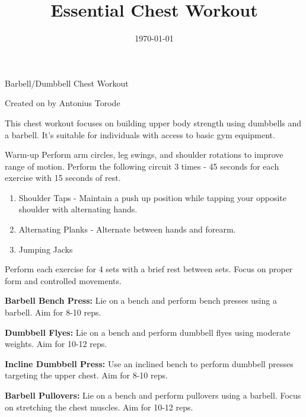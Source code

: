 \documentclass{article}
\newcounter{workout}
\newcounter{exercise}
\renewcommand{\maketitle}{
	\begin{center}
		{\Huge\bfseries\thetitle}
		
		\vspace{0.5em}
		
		Barbell/Dumbbell Chest Workout
		
		\vspace{0.5em}
		
		Created on \thedate\hspace{0.5em}by Antonius Torode
	\end{center}
}
\begin{document}
	\begin{tcolorbox}[colback=gray!15,colframe=black,enforce breakable,pad at break*=5mm,boxrule=0.5mm]
		
		\title{Essential Chest Workout}
		\date{\today}
		\maketitle
		
		This chest workout focuses on building upper body strength using dumbbells and a barbell. It's suitable for individuals with access to basic gym equipment.
		
		\begin{workoutbox}{Warm-up}
			Perform arm circles, leg swings, and shoulder rotations to improve range of motion. Perform the following circuit 3 times - 45 seconds for each exercise with 15 seconds of rest.
			\begin{enumerate}
				\item Shoulder Taps - Maintain a push up position while tapping your opposite shoulder with alternating hands.
				\item Alternating Planks - Alternate between hands and forearm.
				\item Jumping Jacks
			\end{enumerate}
		\end{workoutbox}
		
		Perform each exercise for 4 sets with a brief rest between sets. Focus on proper form and controlled movements.
		
		\begin{exercisebox}
			\textbf{Barbell Bench Press:} Lie on a bench and perform bench presses using a barbell. Aim for 8-10 reps.
		\end{exercisebox}
		
		\begin{exercisebox}
			\textbf{Dumbbell Flyes:} Lie on a bench and perform dumbbell flyes using moderate weights. Aim for 10-12 reps.
		\end{exercisebox}
		
		\begin{exercisebox}
			\textbf{Incline Dumbbell Press:} Use an inclined bench to perform dumbbell presses targeting the upper chest. Aim for 8-10 reps.
		\end{exercisebox}
		
		\begin{exercisebox}
			\textbf{Barbell Pullovers:} Lie on a bench and perform pullovers using a barbell. Focus on stretching the chest muscles. Aim for 10-12 reps.
		\end{exercisebox}
		

\end{tcolorbox}
\end{document}
